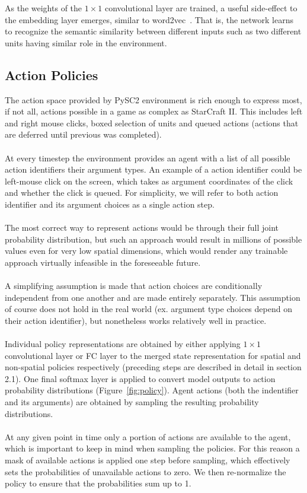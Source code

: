 \pagebreak
\noindent As the weights of the $1 \times 1$ convolutional layer are trained, a useful side-effect to the embedding layer emerges, similar to word2vec~\cite{Mikolov2013}. That is, the network learns to recognize the semantic similarity between different inputs such as two different units having similar role in the environment. 

\subsection{Action Policies}

The action space provided by PySC2 environment is rich enough to express most, if not all, actions possible in a game as complex as StarCraft II. This includes left and right mouse clicks, boxed selection of units and queued actions (actions that are deferred until previous was completed). 
\\\\
At every timestep the environment provides an agent with a list of all possible action identifiers their argument types. An example of a action identifier could be left-mouse click on the screen, which takes as argument coordinates of the click and whether the click is queued. For simplicity, we will refer to both action identifier and its argument choices as a single action step.
\\\\
The most correct way to represent actions would be through their full joint probability distribution, but such an approach would result in millions of possible values even for very low spatial dimensions, which would render any trainable approach virtually infeasible in the foreseeable future.
\\\\
A simplifying assumption is made that action choices are conditionally independent from one another and are made entirely separately. This assumption of course does not hold in the real world (ex. argument type choices depend on their action identifier), but nonetheless works relatively well in practice.
\\\\
Individual policy representations are obtained by either applying $1\times1$ convolutional layer or FC layer to the merged state representation for spatial and non-spatial policies respectively (preceding steps are described in detail in section 2.1). One final softmax layer is applied to convert model outputs to action probability distributions (Figure~\ref{fig:policy}). Agent actions (both the indentifier and its arguments) are obtained by sampling the resulting probability distributions.
\\\\
At any given point in time only a portion of actions are available to the agent, which is important to keep in mind when sampling the policies. For this reason a mask of available actions is applied one step before sampling, which effectively sets the probabilities of unavailable actions to zero. We then re-normalize the policy to ensure that the probabilities sum up to 1.

